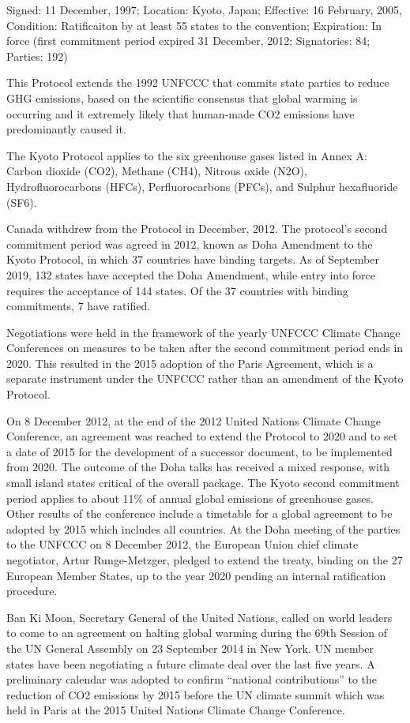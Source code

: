 \documentclass[
  openany]{book}
\begin{document}
Signed: 11 December, 1997; Location: Kyoto, Japan; Effective: 16 February, 2005, Condition: Ratificaiton by at least 55 states to the convention; Expiration: In force (first commitment period expired 31 December, 2012; Signatories: 84; Parties: 192)

This Protocol extends the 1992 UNFCCC that commits state parties to reduce GHG emissions, based on the scientific consensus that global warming is occurring and it extremely likely that human-made CO2 emissions have predominantly caused it.

The Kyoto Protocol applies to the six greenhouse gases listed in Annex A: Carbon dioxide (CO2), Methane (CH4), Nitrous oxide (N2O), Hydrofluorocarbons (HFCs), Perfluorocarbons (PFCs), and Sulphur hexafluoride (SF6).

Canada withdrew from the Protocol in December, 2012. The protocol's second commitment period was agreed in 2012, known as Doha Amendment to the Kyoto Protocol, in which 37 countries have binding targets. As of September 2019, 132 states have accepted the Doha Amendment, while entry into force requires the acceptance of 144 states. Of the 37 countries with binding commitments, 7 have ratified.

Negotiations were held in the framework of the yearly UNFCCC Climate Change Conferences on measures to be taken after the second commitment period ends in 2020. This resulted in the 2015 adoption of the Paris Agreement, which is a separate instrument under the UNFCCC rather than an amendment of the Kyoto Protocol.

On 8 December 2012, at the end of the 2012 United Nations Climate Change Conference, an agreement was reached to extend the Protocol to 2020 and to set a date of 2015 for the development of a successor document, to be implemented from 2020. The outcome of the Doha talks has received a mixed response, with small island states critical of the overall package. The Kyoto second commitment period applies to about 11\% of annual global emissions of greenhouse gases. Other results of the conference include a timetable for a global agreement to be adopted by 2015 which includes all countries. At the Doha meeting of the parties to the UNFCCC on 8 December 2012, the European Union chief climate negotiator, Artur Runge-Metzger, pledged to extend the treaty, binding on the 27 European Member States, up to the year 2020 pending an internal ratification procedure.

Ban Ki Moon, Secretary General of the United Nations, called on world leaders to come to an agreement on halting global warming during the 69th Session of the UN General Assembly on 23 September 2014 in New York. UN member states have been negotiating a future climate deal over the last five years. A preliminary calendar was adopted to confirm ``national contributions'' to the reduction of CO2 emissions by 2015 before the UN climate summit which was held in Paris at the 2015 United Nations Climate Change Conference.
\end{document}
